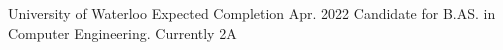

\begin{cventries}

  \cventry
    {University of Waterloo} %
    {} %
    {} %
    {Expected Completion Apr. 2022} %
    {Candidate for B.AS. in Computer Engineering. Currently 2A}

\end{cventries}
